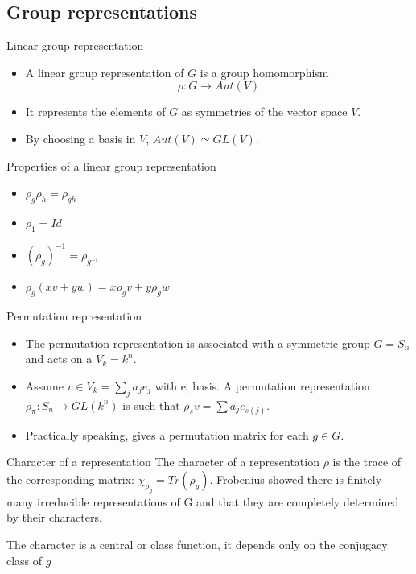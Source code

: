 \documentclass[presentation]{beamer}
\begin{document}
\subsection{Group representations}
\label{sec:org07b6a26}
\begin{frame}[label={sec:org562ec2f}]{Linear group representation}
\begin{itemize}
\item A \alert{linear group representation} of \(G\) is a group homomorphism
$$\rho : G \rightarrow Aut(V)$$

\item It represents the elements of \(G\) as \alert{symmetries of the vector space} \(V\).

\item By choosing a basis in \(V\), \(Aut(V) \simeq GL(V)\).
\end{itemize}
\end{frame}

\begin{frame}[label={sec:orgd1b9fcf}]{Properties of a linear group representation}
\begin{itemize}
\item \(\rho_g \rho_h = \rho_{gh}\)
\item \(\rho_1 = Id\)
\item \((\rho_g)^{-1} = \rho_{g^{-1}}\)
\item \(\rho_g(xv + yw) = x\rho_gv + y\rho_gw\)
\end{itemize}
\end{frame}

\begin{frame}[label={sec:orgeba58a0}]{Permutation representation}
\begin{itemize}
\item The \alert{permutation representation} is associated with a symmetric group \(G =
       S_n\) and acts on a \(V_k = k^n\).

\item Assume \(v \in V_k = \sum_j a_j e_j\) with e\(_{\text{j}}\) basis. A permutation
representation \(\rho_{\pi}: S_n \rightarrow GL(k^n)\) is such that \(\rho_s
       v = \sum a_j e_{s(j)}\).

\item Practically speaking, gives a permutation matrix for each \(g \in G\).
\end{itemize}
\end{frame}

\begin{frame}[label={sec:org904a4df}]{Character of a representation}
The \alert{character} of a representation \(\rho\) is the trace of the corresponding
matrix: \(\chi_{\rho_g} = Tr(\rho_g)\). Frobenius showed there is finitely
many irreducible representations of G and that they are completely
determined by their characters.

The character is a central or class function, it depends only on the
conjugacy class of \(g\)
\end{frame}
\end{document}
